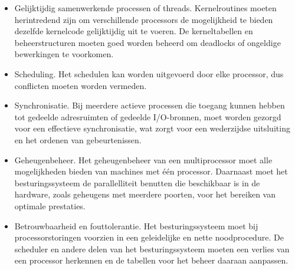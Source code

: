 \begin{itemize}
\item Gelijktijdig samenwerkende processen of threads. Kernelroutines moeten herintredend zijn om verschillende processors de mogelijkheid te bieden dezelfde kernelcode gelijktijdig uit te voeren. De kerneltabellen en beheerstructuren moeten goed worden beheerd om deadlocks of ongeldige bewerkingen te voorkomen.
\item Scheduling. Het schedulen kan worden uitgevoerd door elke processor, dus conflicten moeten worden vermeden.
\item Synchronisatie. Bij meerdere actieve processen die toegang kunnen hebben tot gedeelde adresruimten of gedeelde I/O-bronnen, moet worden gezorgd voor een effectieve synchronisatie, wat zorgt voor een wederzijdse uitsluiting en het ordenen van gebeurtenissen.
\item Geheugenbeheer. Het geheugenbeheer van een multiprocessor moet alle mogelijkheden bieden van machines met één processor. Daarnaast moet het besturingssysteem de parallelliteit benutten die beschikbaar is in de hardware, zoals geheugens met meerdere poorten, voor het bereiken van optimale prestaties.
\item Betrouwbaarheid en fouttolerantie. Het besturingssysteem moet bij processorstoringen voorzien in een geleidelijke en nette noodprocedure. De scheduler en andere delen van het besturingssysteem moeten een verlies van een processor herkennen en de tabellen voor het beheer daaraan aanpassen.
\end{itemize}